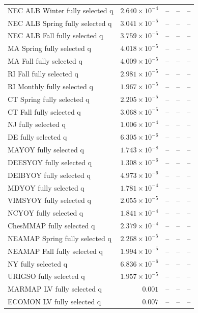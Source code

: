 \documentclass[
]{article}
\begin{document}
\begin{landscape}
\begin{longtable}[t]{lrrrr}
\endfoot
\bottomrule
\endlastfoot
NEC ALB Winter fully selected q & $2.640\times 10^{-4}$ & -- & -- & --\\
NEC ALB Spring fully selected q & $3.041\times 10^{-5}$ & -- & -- & --\\
NEC ALB Fall fully selected q & $3.759\times 10^{-5}$ & -- & -- & --\\
MA Spring fully selected q & $4.018\times 10^{-5}$ & -- & -- & --\\
MA Fall fully selected q & $4.009\times 10^{-5}$ & -- & -- & --\\
\addlinespace
RI Fall fully selected q & $2.981\times 10^{-5}$ & -- & -- & --\\
RI Monthly fully selected q & $1.967\times 10^{-5}$ & -- & -- & --\\
CT Spring fully selected q & $2.205\times 10^{-5}$ & -- & -- & --\\
CT Fall fully selected q & $3.068\times 10^{-5}$ & -- & -- & --\\
NJ fully selected q & $1.006\times 10^{-4}$ & -- & -- & --\\
\addlinespace
DE fully selected q & $6.305\times 10^{-6}$ & -- & -- & --\\
MAYOY fully selected q & $1.743\times 10^{-8}$ & -- & -- & --\\
DEESYOY fully selected q & $1.308\times 10^{-6}$ & -- & -- & --\\
DEIBYOY fully selected q & $4.973\times 10^{-6}$ & -- & -- & --\\
MDYOY fully selected q & $1.781\times 10^{-4}$ & -- & -- & --\\
\addlinespace
VIMSYOY fully selected q & $2.055\times 10^{-5}$ & -- & -- & --\\
NCYOY fully selected q & $1.841\times 10^{-4}$ & -- & -- & --\\
ChesMMAP fully selected q & $2.379\times 10^{-4}$ & -- & -- & --\\
NEAMAP Spring fully selected q & $2.268\times 10^{-5}$ & -- & -- & --\\
NEAMAP Fall fully selected q & $1.994\times 10^{-5}$ & -- & -- & --\\
\addlinespace
NY fully selected q & $6.836\times 10^{-6}$ & -- & -- & --\\
URIGSO fully selected q & $1.957\times 10^{-5}$ & -- & -- & --\\
MARMAP LV fully selected q & $0.001$ & -- & -- & --\\
ECOMON LV fully selected q & $0.007$ & -- & -- & --\\

\end{longtable}
\end{landscape}
\end{document}
